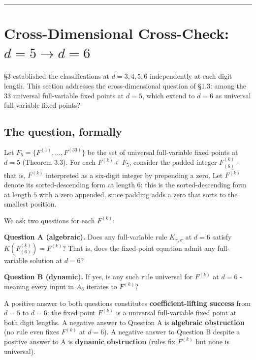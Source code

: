 \documentclass[11pt,letterpaper]{article}
\theoremstyle{paperstyle}
\theoremstyle{paperstyledef}
\theoremstyle{paperstylerem}
\begin{document}
\begin{center}\rule{0.5\linewidth}{0.5pt}\end{center}

\hypertarget{cross-dimensional-cross-check-d-5-to-d-6}{%
\section{Cross-Dimensional Cross-Check: \(d = 5 \to d = 6\)}\label{cross-dimensional-cross-check-d-5-to-d-6}}

§3 established the classifications at \(d = 3, 4, 5, 6\) independently
at each digit length. This section addresses the cross-dimensional
question of §1.3: among the \(33\) universal full-variable fixed points
at \(d = 5\), which extend to \(d = 6\) as universal full-variable fixed
points?

\hypertarget{the-question-formally}{%
\subsection{The question, formally}\label{the-question-formally}}

Let \(F_5 = \{F^{(1)}, \ldots, F^{(33)}\}\) be the set of universal
full-variable fixed points at \(d = 5\) (Theorem 3.3). For each
\(F^{(k)} \in F_5\), consider the padded integer \(F^{(k)}_{(6)}\) -
that is, \(F^{(k)}\) interpreted as a six-digit integer by prepending a
zero. Let \(\overline{F^{(k)}}\) denote its sorted-descending form at
length \(6\): this is the sorted-descending form at length \(5\) with a
zero appended, since padding adds a zero that sorts to the smallest
position.

We ask two questions for each \(F^{(k)}\):

\textbf{Question A (algebraic).} Does any full-variable rule
\(K_{\pi, \sigma}\) at \(d = 6\) satisfy \(K(F^{(k)}_{(6)}) = F^{(k)}\)?
That is, does the fixed-point equation admit any full-variable solution
at \(d = 6\)?

\textbf{Question B (dynamic).} If yes, is any such rule universal for
\(F^{(k)}\) at \(d = 6\) - meaning every input in \(A_6\) iterates to
\(F^{(k)}\)?

A positive answer to both questions constitutes
\textbf{coefficient-lifting success} from \(d = 5\) to \(d = 6\): the
fixed point \(F^{(k)}\) is a universal full-variable fixed point at both
digit lengths. A negative answer to Question A is \textbf{algebraic
obstruction} (no rule even fixes \(F^{(k)}\) at \(d = 6\)). A negative
answer to Question B despite a positive answer to A is \textbf{dynamic
obstruction} (rules fix \(F^{(k)}\) but none is universal).
\end{document}
